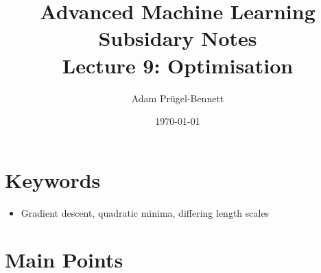 \documentclass[11pt]{article}
\author{Adam Prügel-Bennett}
\date{\today}
\title{Advanced Machine Learning Subsidary Notes\\\medskip
\large Lecture 9: Optimisation}
\begin{document}
\maketitle

\section{Keywords}
\label{sec:org004ff9f}
\begin{itemize}
\item Gradient descent, quadratic minima, differing length scales
\end{itemize}

\section{Main Points}
\label{sec:org28f5133}
\end{document}

